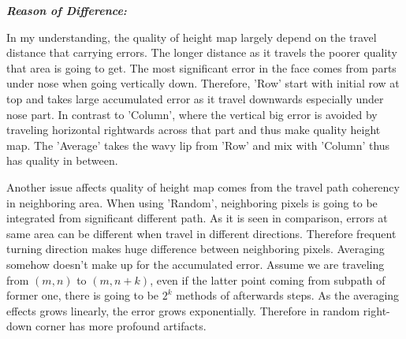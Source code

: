 \documentclass[a4paper]{article}
\begin{document}
{\bfseries{\em Reason of Difference:}} 

In my understanding, the quality of height map largely depend on the travel distance that carrying errors. The longer distance as it travels the poorer quality that area is going to get. The most significant error in the face comes from parts under nose when going vertically down. Therefore, 'Row' start with initial row at top and takes large accumulated error as it travel downwards especially under nose part. In contrast to 'Column', where the vertical big error is avoided by traveling horizontal rightwards across that part and thus make quality height map. The 'Average' takes the wavy lip from 'Row' and mix with 'Column' thus has quality in between. 

Another issue affects quality of height map comes from the travel path coherency in neighboring area. When using 'Random', neighboring pixels is going to be integrated from significant different path. As it is seen in comparison, errors at same area can be different when travel in different directions. Therefore frequent turning direction makes huge difference between neighboring pixels. Averaging somehow  doesn't make up for the accumulated error. Assume we are traveling from $(m,n)$ to $(m,n+k)$, even if the latter point coming from subpath of former one, there is going to be $2^{k}$ methods of afterwards steps. As the averaging effects grows linearly, the error grows exponentially. Therefore in random right-down corner has more profound artifacts.
\end{document}
